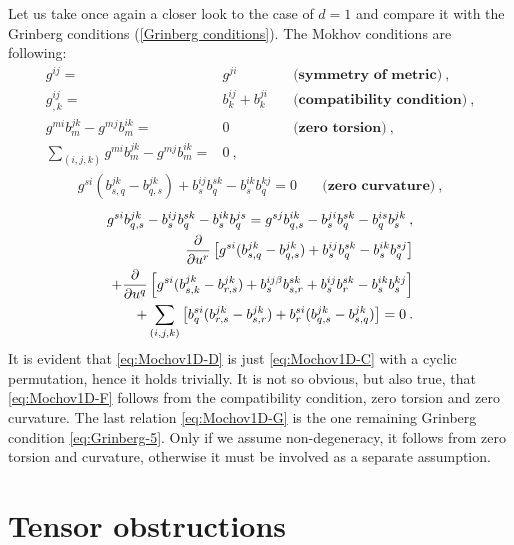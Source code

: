 \begin{remark}
    Let us take once again a closer look to the case of $d=1$ and compare it with the Grinberg conditions (\vref{Grinberg conditions}). The Mokhov conditions are following:
    \begin{align}
        g^{ij} =& g^{ji} \quad &\textbf{(symmetry of metric)} \:, \label{eq:Mochov1D-A}\\
        g^{ij}_{,k} =& b^{ij}_k + b^{ji}_k \quad &\textbf{(compatibility condition)} \label{eq:Mochov1D-B}\:, \\
        g^{mi} b^{jk}_m - g^{mj} b^{ik}_m =& 0 \quad &\textbf{(zero torsion)} \:, \label{eq:Mochov1D-C}\\
        \sum_{(i,j,k)} g^{mi} b^{jk}_m - g^{mj} b^{ik}_m =& 0 \:,\quad& \label{eq:Mochov1D-D}
    \end{align}
    \begin{align}
        g^{si} (b^{jk}_{s,q} - b^{jk}_{q,s}) + b^{ij}_s b^{sk}_q - b^{ik}_s b^{kj}_q = 0 \quad &\textbf{(zero curvature)}\:, \label{eq:Mochov1D-E}
    \end{align}
    \begin{align}
        g^{si} b^{j k}_{q,s} - b^{ij}_s b^{s k}_q - b^{i k}_s b^{j s}_q = g^{s j } b^{i k}_{q,s} - b^{ji}_s b^{s k}_q - b^{is}_q b^{jk}_s \:, \label{eq:Mochov1D-F}\\
        \frac{\partial }{\partial u^r} \left[ g^{si} (b^{j k }_{s,q} - b^{j k}_{q,s}) + b^{ij}_s b^{s k}_q - b^{i k}_s b^{s j}_q \right] 
        \nonumber \\+ \frac{\partial }{\partial u^q} \left[ g^{si } (b^{j k}_{s,k} - b^{j k}_{r,s}) + b^{ij \beta}_s b^{s k}_{s,r} + b^{ij}_s b^{s k}_r - b^{ik}_s b^{kj}_s \right] \label{eq:Mochov1D-G}
        \\+ \sum_{(i,j,k)} \left[ b^{si}_q (b^{j k}_{r,s} - b^{j k}_{s,r}) + b^{s i}_r (b^{j k}_{q,s} - b^{j k}_{s,q}) \right] \nonumber
        = 0 \:.
    \end{align}
    It is evident that \eqref{eq:Mochov1D-D} is just \eqref{eq:Mochov1D-C} with a cyclic permutation, hence it holds trivially. It is not so obvious, but also true, that \eqref{eq:Mochov1D-F} follows from the compatibility condition, zero torsion and zero curvature. 
     The last relation \eqref{eq:Mochov1D-G} is the one remaining Grinberg condition \eqref{eq:Grinberg-5}. Only if we assume non-degeneracy, it follows from zero torsion and curvature, otherwise it must be involved as a separate assumption.
\end{remark}


\section{Tensor obstructions}

